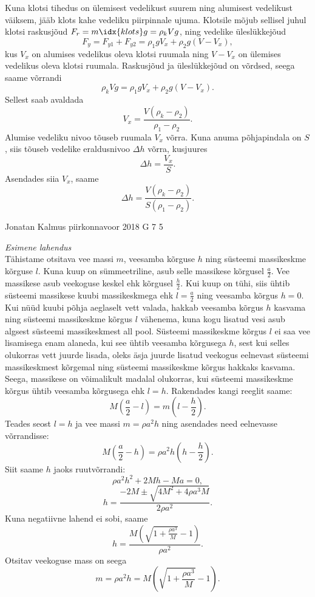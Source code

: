 \documentclass[11pt, twoside]{article}
\begin{document}
{{\ifSolution
Kuna klotsi tihedus on ülemisest vedelikust suurem ning alumisest vedelikust väiksem, jääb klots kahe vedeliku piirpinnale ujuma. Klotsile mõjub sellisel juhul klotsi raskusjõud $F_r = m\idx{klots}g=\rho_k Vg$, ning vedelike üleslükkejõud
\[ F_y=F_{y1}+F_{y2}=\rho_1gV_x + \rho_2g(V-V_x), \]
kus $V_x$ on alumises vedelikus oleva klotsi ruumala ning $V-V_x$ on ülemises vedelikus oleva klotsi ruumala.
Raskusjõud ja üleslükkejõud on võrdsed, seega saame võrrandi
\[ \rho_k Vg = \rho_1gV_x + \rho_2g(V-V_x). \]
Sellest saab avaldada 
\[ V_x = \frac{V(\rho_k-\rho_2)}{\rho_1-\rho_2}. \]
Alumise vedeliku nivoo tõuseb ruumala $V_x$ võrra. Kuna anuma põhjapindala on $S$, siis tõuseb vedelike eraldusnivoo $\Delta h$ võrra, kusjuures
\[ \Delta h = \frac{V_x}{S}. \]
Asendades siia $V_x$, saame
\[ \Delta h = \frac{V(\rho_k-\rho_2)}{S(\rho_1-\rho_2)}. \]
\fi
}

{Jonatan Kalmus} %
{piirkonnavoor} %
{2018} %
{G 7} %
{5} %
{

\ifSolution
\emph{Esimene lahendus}\\
Tähistame otsitava vee massi $m$, veesamba kõrguse $h$ ning süsteemi massikeskme kõrguse $l$. Kuna kuup on sümmeetriline, asub selle massikese kõrgusel $\frac{a}{2}$. Vee massikese asub veekoguse keskel ehk kõrgusel $\frac{h}{2}$. Kui kuup on tühi, siis ühtib süsteemi massikese kuubi massikeskmega ehk $l=\frac{a}{2}$ ning veesamba kõrgus $h=0$. Kui nüüd kuubi põhja aeglaselt vett valada, hakkab veesamba kõrgus $h$ kasvama ning süsteemi massikeskme kõrgus $l$ vähenema, kuna kogu lisatud vesi asub algsest süsteemi massikeskmest all pool. Süsteemi massikeskme kõrgus $l$ ei saa vee lisamisega enam alaneda, kui see ühtib veesamba kõrgusega $h$, sest kui selles olukorras vett juurde lisada, oleks äsja juurde lisatud veekogus eelnevast süsteemi massikeskmest kõrgemal ning süsteemi massikeskme kõrgus hakkaks kasvama. Seega, massikese on võimalikult madalal olukorras, kui süsteemi massikeskme kõrgus ühtib veesamba kõrgusega ehk $l=h$.
Rakendades kangi reeglit saame:
$$M(\frac{a}{2}-l)=m(l-\frac{h}{2}).$$ 
Teades seost $l=h$ ja vee massi $m=\rho a^2h$ ning asendades need eelnevasse võrrandisse:
$$M(\frac{a}{2}-h)=\rho a^2h(h-\frac{h}{2}).$$ 
Siit saame $h$ jaoks ruutvõrrandi:
$$\rho a^2h^2+2Mh-Ma=0,$$
$$h=\frac{-2M \pm \sqrt{4M^2+4\rho a^3M}}{2\rho a^2}.$$
Kuna negatiivne lahend ei sobi, saame
$$h=\frac{M(\sqrt{1+\frac{\rho a^3}{M}}-1)}{\rho a^2}.$$
Otsitav veekoguse mass on seega
$$m=\rho a^2h=M(\sqrt{1+\frac{\rho a^3}{M}}-1).$$

}}
\end{document}
